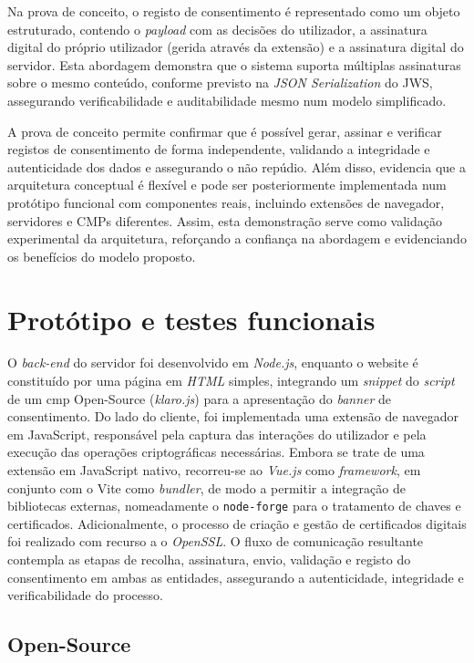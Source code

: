 Na prova de conceito, o registo de consentimento é representado como um objeto estruturado, contendo o \textit{payload} com as decisões do utilizador, a assinatura digital do próprio utilizador (gerida através da extensão) e a assinatura digital do servidor. Esta abordagem demonstra que o sistema suporta múltiplas assinaturas sobre o mesmo conteúdo, conforme previsto na \textit{JSON Serialization} do JWS, assegurando verificabilidade e auditabilidade mesmo num modelo simplificado.

A prova de conceito permite confirmar que é possível gerar, assinar e verificar registos de consentimento de forma independente, validando a integridade e autenticidade dos dados e assegurando o não repúdio. Além disso, evidencia que a arquitetura conceptual é flexível e pode ser posteriormente implementada num protótipo funcional com componentes reais, incluindo extensões de navegador, servidores e CMPs diferentes. Assim, esta demonstração serve como validação experimental da arquitetura, reforçando a confiança na abordagem e evidenciando os benefícios do modelo proposto.

\section{Protótipo e testes funcionais}

O \textit{back-end} do servidor foi desenvolvido em \textit{Node.js}, enquanto o website é constituído por uma página em \textit{HTML} simples, integrando um \textit{snippet} do \textit{script} de um \acrshort{cmp} Open-Source (\textit{klaro.js}) para a apresentação do \textit{banner} de consentimento.
Do lado do cliente, foi implementada uma extensão de navegador em JavaScript, responsável pela captura das interações do utilizador e pela execução das operações criptográficas necessárias. Embora se trate de uma extensão em JavaScript nativo, recorreu-se ao \textit{Vue.js} como \textit{framework}, em conjunto com o Vite como \textit{bundler}, de modo a permitir a integração de bibliotecas externas, nomeadamente o \texttt{node-forge} para o tratamento de chaves e certificados. Adicionalmente, o processo de criação e gestão de certificados digitais foi realizado com recurso a o \textit{OpenSSL}. O fluxo de comunicação resultante contempla as etapas de recolha, assinatura, envio, validação e registo do consentimento em ambas as entidades, assegurando a autenticidade, integridade e verificabilidade do processo.

\subsection{Open-Source}

